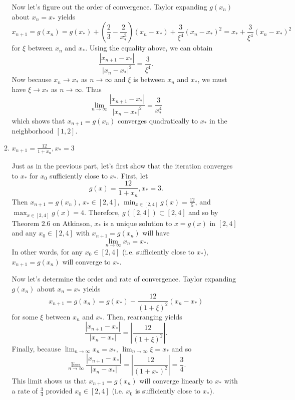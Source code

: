 \documentclass[a4paper,12pt]{article}
\newcommand{\abs}[1]{\left| #1 \right|}
\begin{document}
\begin{enumerate}[label = \arabic*.]
\begin{enumerate}[label = \roman*.]
			Now let's figure out the order of convergence. Taylor expanding $ g(x_n) $ about $ x_n = x_* $ yields
			\[
				x_{n+1} = g(x_n) = g(x_*) + \left(\frac{2}{3} - \frac{2}{x_*^3}\right)(x_n - x_*) + \frac{3}{\xi^4}(x_n - x_*)^2 = x_* + \frac{3}{\xi^4}(x_n - x_*)^2
			\]
			 for $ \xi $ between $ x_n $ and $ x_* $. Using the equality above, we can obtain
			\[
				\frac{\abs{x_{n+1} - x_*}}{\abs{x_n - x_*}^2} = \frac{3}{\xi^4}.
			\]
			Now because $ x_n \to x_* $ as $ n \to \infty $ and $ \xi $ is between $ x_n $ and $ x_* $, we must have $ \xi \to x_* $ as $ n \to \infty $. Thus
			\[
				\lim_{n \to \infty} \frac{\abs{x_{n+1} - x_*}}{\abs{x_n - x_*}^2} = \frac{3}{x_*^4}
			\]
			which shows that $ x_{n+1} = g(x_n) $ converges quadratically to $ x_* $ in the neighborhood $ [1,2] $.
			
			
			\item $ x_{n+1} = \frac{12}{1+x_n}, x_* = 3 $
			
			Just as in the previous part, let's first show that the iteration converges to $ x_* $ for $ x_0 $ sufficiently close to $ x_* $. First, let
			\[
				g(x) = \frac{12}{1+x_n}, x_* = 3.
			\]
			Then $ x_{n+1} = g(x_n) $, $ x_* \in [2,4] $, $ \min_{x \in [2,4]}g(x) = \frac{12}{5} $, and $ \max_{x \in [2,4]} g(x) = 4$. Therefore, $ g([2,4]) \subset [2,4] $ and so by Theorem 2.6 on Atkinson, $ x_* $ is a unique solution to $ x = g(x) $ in $ [2,4] $ and any $ x_0 \in [2,4] $ with $ x_{n+1} = g(x_n)$ will have
			\[
				\lim_{n \to \infty}x_n = x_*.
			\]
			In other words, for any $ x_0 \in [2,4] $ (i.e. sufficiently close to $ x_* $), $ x_{n+1} = g(x_n) $ will converge to $ x_* $.
			
			Now let's determine the order and rate of convergence. Taylor expanding $ g(x_n) $ about $ x_n = x_* $ yields
			\[
				x_{n+1} = g(x_n) = g(x_*) - \frac{12}{(1+\xi)^2}(x_n - x_*)
			\]
			for some $ \xi $ between $ x_n $ and $ x_* $. Then, rearranging yields
			\[
				\frac{\abs{x_{n +1} - x_*}}{\abs{x_n - x_*}} = \abs{\frac{12}{(1 + \xi)^2}}.
			\]
			Finally, because $ \lim_{n\to\infty} x_n = x_*$, $  $$\lim_{n\to\infty} \xi = x_*$ and so
			\[
				\lim_{n \to \infty} \frac{\abs{x_{n +1} - x_*}}{\abs{x_n - x_*}} = \abs{\frac{12}{(1 + x_*)^2}} = \frac{3}{4}.
			\]
			This limit shows us that $ x_{n+1} = g(x_n) $ will converge linearly to $ x_* $ with a rate of $ \frac{3}{4} $ provided $ x_0 \in [2,4] $ (i.e. $ x_0 $ is sufficiently close to $ x_* $).
		\end{enumerate}
	

\end{enumerate}
\end{document}
